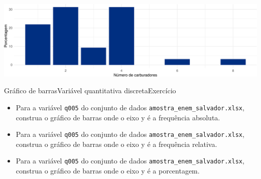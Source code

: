 \documentclass[
  10pt,
  ignorenonframetext,
]{beamer}
\providecommand{\tightlist}{%
  \setlength{\itemsep}{0pt}\setlength{\parskip}{0pt}}
\begin{document}
\begin{frame}
\begin{center}\includegraphics[width=1\linewidth]{aulas_files/figure-beamer/unnamed-chunk-61-1} \end{center}
\end{frame}

\begin{frame}[fragile]{Gráfico de barras\newline Variável quantitativa
discreta\newline Exercício}
\protect\hypertarget{gruxe1fico-de-barrasvariuxe1vel-quantitativa-discretaexercuxedcio}{}
\begin{itemize}
\tightlist
\item
  Para a variável \texttt{q005} do conjunto de dados
  \texttt{amostra\_enem\_salvador.xlsx}, construa o gráfico de barras
  onde o eixo y é a frequência absoluta.
\item
  Para a variável \texttt{q005} do conjunto de dados
  \texttt{amostra\_enem\_salvador.xlsx}, construa o gráfico de barras
  onde o eixo y é a frequência relativa.
\item
  Para a variável \texttt{q005} do conjunto de dados
  \texttt{amostra\_enem\_salvador.xlsx}, construa o gráfico de barras
  onde o eixo y é a porcentagem.
\end{itemize}
\end{frame}
\end{document}
